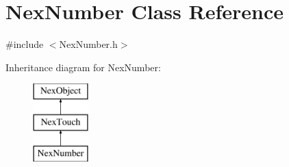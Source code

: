 \hypertarget{class_nex_number}{\section{Nex\+Number Class Reference}
\label{class_nex_number}
}


{\ttfamily \#include $<$Nex\+Number.\+h$>$}

Inheritance diagram for Nex\+Number\+:\begin{figure}[H]
\begin{center}
\leavevmode
\includegraphics[height=3.000000cm]{class_nex_number}
\end{center}
\end{figure}

